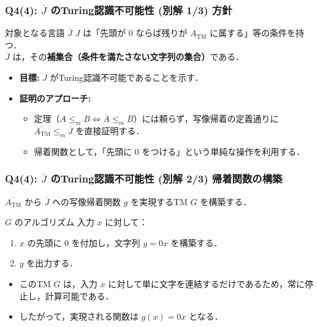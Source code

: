 \begin{frame}[fragile]
\frametitle{Q4(4): $\overline{J}$ のTuring認識不可能性 (別解 1/3) 方針}
\begin{block}{対象となる言語 $\overline{J}$}
  $J$ は「先頭が $0$ ならば残りが $A_{\mathrm{TM}}$ に属する」等の条件を持つ．\\
  $\overline{J}$ は，その\textbf{補集合（条件を満たさない文字列の集合）}である．
\end{block}

\begin{itemize}
  \item \textbf{目標:} $\overline{J}$ がTuring認識不可能であることを示す．
  \item \textbf{証明のアプローチ:}
  \begin{itemize}
      \item 定理（$A \le_m B \iff \overline{A} \le_m \overline{B}$）には頼らず，写像帰着の定義通りに \alert{$\overline{A_{\mathrm{TM}}} \le_m \overline{J}$} を直接証明する．
      \item 帰着関数として，「先頭に $0$ をつける」という単純な操作を利用する．
  \end{itemize}
\end{itemize}
\end{frame}

\begin{frame}[fragile]
\frametitle{Q4(4): $\overline{J}$ のTuring認識不可能性 (別解 2/3) 帰着関数の構築}
$\overline{A_{\mathrm{TM}}}$ から $\overline{J}$ への写像帰着関数 $g$ を実現するTM $G$ を構築する．

\begin{block}{$G$ のアルゴリズム}
  入力 $x$ に対して：
  \begin{enumerate}
      \item $x$ の先頭に $0$ を付加し，文字列 $y = 0x$ を構築する．
      \item $y$ を出力する．
  \end{enumerate}
\end{block}

\vspace{1em}
\begin{itemize}
  \item このTM $G$ は，入力 $x$ に対して単に文字を連結するだけであるため，常に停止し，計算可能である．
  \item したがって，実現される関数は $g(x) = 0x$ となる．
\end{itemize}
\end{frame}


